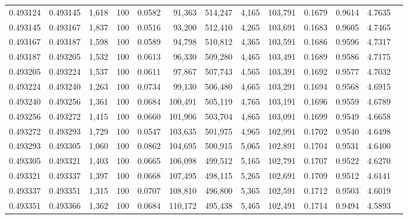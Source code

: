 \begin{tabular}{rrrrrrrrrrrrr}
0.493124 & 0.493145 & 1,618 & 100 &                                     0.0582 &  91,363 & 514,247 &   4,165 & 103,791 & 0.1679 & 0.9614 & 4.7635 \\
0.493145 & 0.493167 & 1,837 & 100 &                                     0.0516 &  93,200 & 512,410 &   4,265 & 103,691 & 0.1683 & 0.9605 & 4.7465 \\
0.493167 & 0.493187 & 1,598 & 100 &                                     0.0589 &  94,798 & 510,812 &   4,365 & 103,591 & 0.1686 & 0.9596 & 4.7317 \\
0.493187 & 0.493205 & 1,532 & 100 &                                     0.0613 &  96,330 & 509,280 &   4,465 & 103,491 & 0.1689 & 0.9586 & 4.7175 \\
0.493205 & 0.493224 & 1,537 & 100 &                                     0.0611 &  97,867 & 507,743 &   4,565 & 103,391 & 0.1692 & 0.9577 & 4.7032 \\
0.493224 & 0.493240 & 1,263 & 100 &                                     0.0734 &  99,130 & 506,480 &   4,665 & 103,291 & 0.1694 & 0.9568 & 4.6915 \\
0.493240 & 0.493256 & 1,361 & 100 &                                     0.0684 & 100,491 & 505,119 &   4,765 & 103,191 & 0.1696 & 0.9559 & 4.6789 \\
0.493256 & 0.493272 & 1,415 & 100 &                                     0.0660 & 101,906 & 503,704 &   4,865 & 103,091 & 0.1699 & 0.9549 & 4.6658 \\
0.493272 & 0.493293 & 1,729 & 100 &                                     0.0547 & 103,635 & 501,975 &   4,965 & 102,991 & 0.1702 & 0.9540 & 4.6498 \\
0.493293 & 0.493305 & 1,060 & 100 &                                     0.0862 & 104,695 & 500,915 &   5,065 & 102,891 & 0.1704 & 0.9531 & 4.6400 \\
0.493305 & 0.493321 & 1,403 & 100 &                                     0.0665 & 106,098 & 499,512 &   5,165 & 102,791 & 0.1707 & 0.9522 & 4.6270 \\
0.493321 & 0.493337 & 1,397 & 100 &                                     0.0668 & 107,495 & 498,115 &   5,265 & 102,691 & 0.1709 & 0.9512 & 4.6141 \\
0.493337 & 0.493351 & 1,315 & 100 &                                     0.0707 & 108,810 & 496,800 &   5,365 & 102,591 & 0.1712 & 0.9503 & 4.6019 \\
0.493351 & 0.493366 & 1,362 & 100 &                                     0.0684 & 110,172 & 495,438 &   5,465 & 102,491 & 0.1714 & 0.9494 & 4.5893 \\

\end{tabular}
